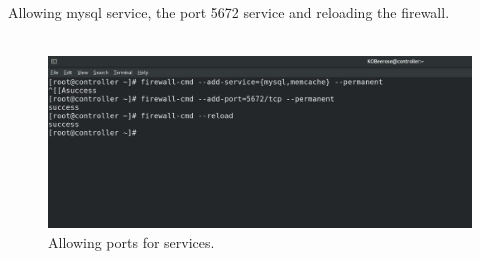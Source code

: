 \begin{spacing}{1.2}
\par Allowing mysql service, the port 5672 service and reloading the firewall.\\
\\
\begin{figure}[!htb] 
\begin{center} 
\includegraphics[width=.8\linewidth]{Cloud/Pre-Requirements/Allowing ports for services.} 
\end{center} 
\caption{Allowing ports for services.} 
\end{figure}  \FloatBarrier
\\


\end{spacing}